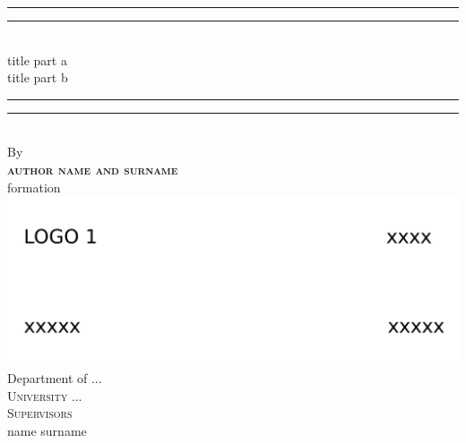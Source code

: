 \begin{titlingpage}
\begin{SingleSpace}
\calccentering{\unitlength} 
\begin{adjustwidth*}{-0.5cm}{0.5cm}
\vspace*{5mm}
\begin{center}
\rule[0.5ex]{\linewidth}{2pt}\vspace*{-\baselineskip}\vspace*{3.2pt}
\rule[0.5ex]{\linewidth}{1pt}\\[\baselineskip]
{\huge title part a\\
\vspace{2mm}
 title part b }\\[4mm]
\rule[0.5ex]{\linewidth}{1pt}\vspace*{-\baselineskip}\vspace*{4.2pt}
\rule[0.5ex]{\linewidth}{2pt}\\
\vspace{4.5mm}
{\large By}\\
\vspace{4.5mm}
{\large\textbf{\textsc{author name and surname}}}\\
\vspace{2.5mm}
\large{formation }\\
\vspace{9mm}
\includegraphics[scale=0.4]{logos/logo1.jpg}\\
\vspace{4mm}
{\large Department of ...\\
\vspace{2mm}
\textsc{University ...}}\\
\vspace{9mm}
{\Large\textsc{Supervisors}}\\
\vspace{2mm}
name surname\\

\end{center}
\end{adjustwidth*}
\end{SingleSpace}
\end{titlingpage}
